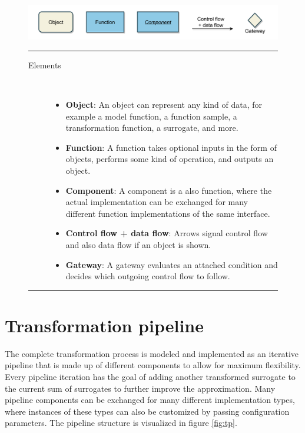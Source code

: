 \documentclass[
  a4paper,  %
  twoside,  %
  bibliography=totoc,
  headsepline,
  cleardoublepage=empty,
  parskip=half,
  draft=false
]{scrbook}
\newcommand{\delimit}{{\color{charcoal}\noindent\rule{\textwidth}{1pt}}}
\begin{document}
\begin{mdframed}[style=style,frametitle={Notation}]
\begin{figure}[H]

\includegraphics[width=\textwidth]{graphics/definitions.pdf}
\vspace{-7.5mm}

\delimit

\vspace{3.5mm}

\begin{description}
\item[Elements] {~ \begin{itemize}[\null]
\item \textbf{Object}: An object can represent any kind of data, for example a model function, a function sample, a transformation function, a surrogate, and more.
\item \textbf{Function}: A function takes optional inputs in the form of objects, performs some kind of operation, and outputs an object.
\item \textbf{Component}: A component is a also function, where the actual implementation can be exchanged for many different function implementations of the same interface.
\item \textbf{Control flow + data flow}: Arrows signal control flow and also data flow if an object is shown.
\item \textbf{Gateway}: A gateway evaluates an attached condition and decides which outgoing control flow to follow.
\end{itemize}}
\end{description}

\delimit

\label{fig:defs}
\end{figure}
\end{mdframed}


\newpage
\section{Transformation pipeline}
\label{sec:tp}

The complete transformation process is modeled and implemented as an iterative pipeline that is made up of different components to allow for maximum flexibility.
Every pipeline iteration has the goal of adding another transformed surrogate to the current sum of surrogates to further improve the approximation.
Many pipeline components can be exchanged for many different implementation types, where instances of these types can also be customized by passing configuration parameters.
The pipeline structure is visualized in figure \cref{fig:tp}.
\end{document}
